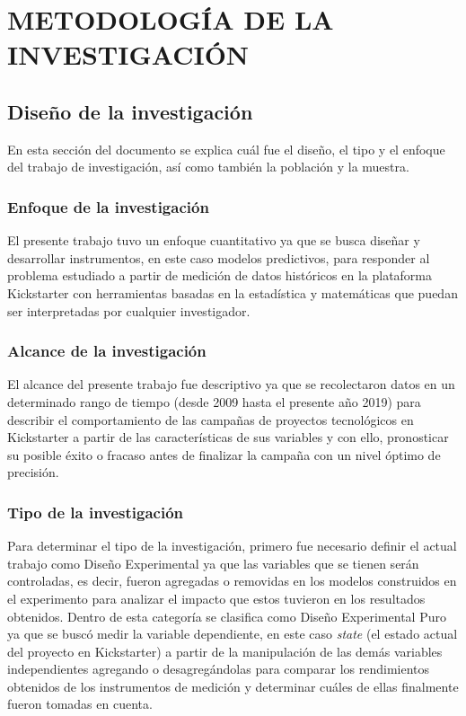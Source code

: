\chapter{METODOLOGÍA DE LA INVESTIGACIÓN}
\section{Diseño de la investigación}
En esta sección del documento se explica cuál fue el diseño, el tipo y el enfoque del trabajo de
investigación, así como también la población y la muestra. 

\subsection{Enfoque de la investigación}
El presente trabajo tuvo un enfoque cuantitativo ya que se busca diseñar y desarrollar instrumentos, en este caso modelos predictivos, para responder al problema estudiado a partir de medición de datos históricos en la plataforma Kickstarter con herramientas basadas en la estadística y matemáticas que puedan ser interpretadas por cualquier investigador. 

\subsection{Alcance de la investigación}
El alcance del presente trabajo fue descriptivo ya que se recolectaron datos en un determinado rango de tiempo (desde 2009 hasta el presente año 2019) para describir el comportamiento de las campañas de proyectos tecnológicos en Kickstarter a partir de las características de sus variables y con ello, pronosticar su posible éxito o fracaso antes de finalizar la campaña con un nivel óptimo de precisión.

\subsection{Tipo de la investigación}
Para determinar el tipo de la investigación, primero fue necesario definir el actual trabajo como Diseño Experimental ya que las variables que se tienen serán controladas, es decir, fueron agregadas o removidas en los modelos construidos en el experimento para analizar el impacto que estos tuvieron en los resultados obtenidos. Dentro de esta categoría se clasifica como Diseño Experimental Puro ya que se buscó medir la variable dependiente, en este caso \textit{state} (el estado actual del proyecto en Kickstarter) a partir de la manipulación de las demás variables independientes agregando o desagregándolas para comparar los rendimientos obtenidos de los instrumentos de medición y determinar cuáles de ellas finalmente fueron tomadas en cuenta.

